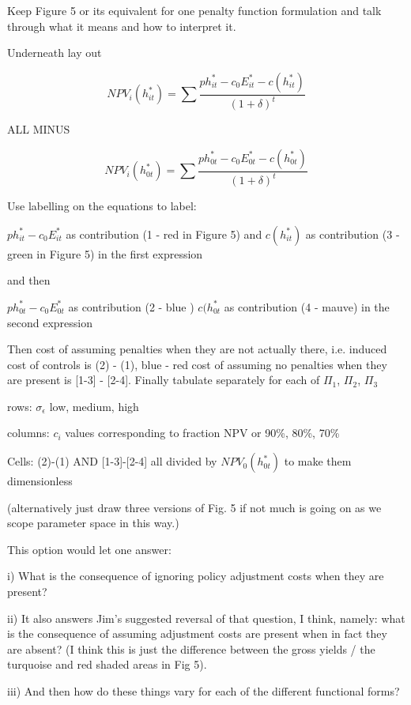 \documentclass[authoryear, review, 12pt]{elsarticle}
\begin{document}
{\color{blue} Keep Figure 5 or its equivalent for one penalty function formulation and talk through what it means and how to interpret it.

Underneath lay out

$$ NPV_i(h_{it}^*) = \sum \frac{p h^*_{it}-c_0E^*_{it}-c(h^*_{it})}{(1+\delta)^t} $$

 
ALL MINUS

$$ NPV_i(h_{0t}^*) = \sum \frac{p h^*_{0t}-c_0E^*_{0t}-c(h^*_{0t})}{(1+\delta)^t} $$

}

{\color{blue}

 Use labelling on the equations to label:

$p h^*_{it}-c_0E^*_{it} $  as contribution (1 - red in Figure 5)
and $c(h^*_{it})$ as contribution (3 - green in Figure 5) in the first expression 

 and then

$p h^*_{0t}-c_0E^*_{0t}$ as contribution (2 - blue )
$c(h^*_{0t}$ as contribution (4 - mauve) in the second expression

Then cost of assuming penalties when they are not actually there, i.e. induced cost of controls is (2) - (1),  blue - red cost of assuming no penalties when they are present is [1-3] - [2-4]. Finally tabulate separately for each of $\Pi_1$, $\Pi_2$, $\Pi_3$

rows: $\sigma_{\epsilon}$ low, medium, high

columns: $c_i$ values corresponding to fraction NPV or 90\%, 80\%, 70\%

Cells: (2)-(1) AND [1-3]-[2-4] all divided by $NPV_0(h^*_{0t})$ to make them dimensionless

(alternatively just draw three versions of Fig. 5 if not much is going on as we scope parameter space in this way.)


   
This option would let one answer:

i) What is the consequence of ignoring policy adjustment costs when they are present?

 ii) It also answers Jim’s suggested reversal of that question, I think, namely: what is the consequence of assuming adjustment costs are present when in fact they are absent? (I think this is just the difference between the gross yields / the turquoise and red shaded areas in Fig 5).

iii) And then how do these things vary for each of the different functional forms?
   
}
\end{document}
